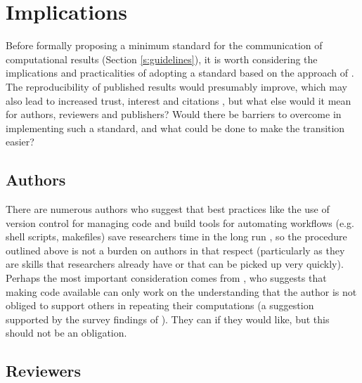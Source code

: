 \section{Implications}

Before formally proposing a minimum standard for the communication of computational results (Section \ref{s:guidelines}), it is worth considering the implications and practicalities of adopting a standard based on the approach of \citet{Irving2015}. The reproducibility of published results would presumably improve, which may also lead to increased trust, interest and citations \citep{Piwowar2007}, but what else would it mean for authors, reviewers and publishers? Would there be barriers to overcome in implementing such a standard, and what could be done to make the transition easier?

\subsection{Authors}

There are numerous authors who suggest that best practices like the use of version control for managing code and build tools for automating workflows (e.g. shell scripts, makefiles) save researchers time in the long run \citep[e.g.][]{Sandve2013,Wilson2014a}, so the procedure outlined above is not a burden on authors in that respect (particularly as they are skills that researchers already have or that can be picked up very quickly). Perhaps the most important consideration comes from \citet{Easterbrook2014}, who suggests that making code available can only work on the understanding that the author is not obliged to support others in repeating their computations (a suggestion supported by the survey findings of \citet{Stodden2010}). They can if they would like, but this should not be an obligation.

\subsection{Reviewers}

